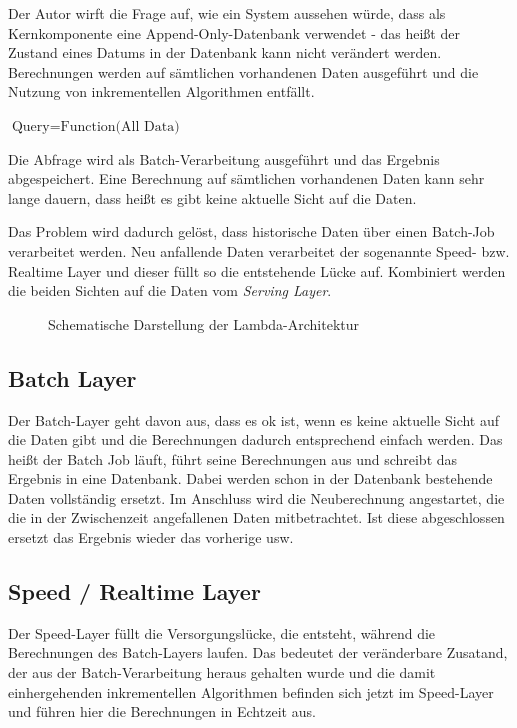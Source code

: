 \documentclass[a4paper,11pt]{scrartcl}
\begin{document}
  Der Autor wirft die Frage auf, wie ein System aussehen würde, dass als
  Kernkomponente eine Append-Only-Datenbank verwendet - das heißt der Zustand
  eines Datums in der Datenbank kann nicht verändert werden. Berechnungen werden
  auf sämtlichen vorhandenen Daten ausgeführt und die Nutzung von inkrementellen
  Algorithmen entfällt.

  $\text{Query} = \text{Function(All Data)}$

  Die Abfrage wird als Batch-Verarbeitung ausgeführt und das Ergebnis
  abgespeichert. Eine Berechnung auf sämtlichen vorhandenen Daten kann sehr lange
  dauern, dass heißt es gibt keine aktuelle Sicht auf die Daten.

  Das Problem wird dadurch gelöst, dass historische Daten über einen Batch-Job
  verarbeitet werden. Neu anfallende Daten verarbeitet der sogenannte Speed- bzw.
  Realtime Layer und dieser füllt so die entstehende Lücke auf. Kombiniert werden
  die beiden Sichten auf die Daten vom \textit{Serving Layer}.

  \begin{figure}[h]
    \center
    \scalebox{.7}{}
    \caption{Schematische Darstellung der Lambda-Architektur}
    \label{fig:lambdaarch}
  \end{figure}

  \subsection{Batch Layer}
  Der Batch-Layer geht davon aus, dass es ok ist, wenn es keine aktuelle Sicht
  auf die Daten gibt und die Berechnungen dadurch entsprechend einfach werden.
  Das heißt der Batch Job läuft, führt seine Berechnungen aus und schreibt das
  Ergebnis in eine Datenbank. Dabei werden schon in der Datenbank bestehende
  Daten vollständig ersetzt. Im Anschluss wird die Neuberechnung angestartet, die
  die in der Zwischenzeit angefallenen Daten mitbetrachtet. Ist diese
  abgeschlossen ersetzt das Ergebnis wieder das vorherige usw.

  \subsection{Speed / Realtime Layer}
  Der Speed-Layer füllt die Versorgungslücke, die entsteht, während die
  Berechnungen des Batch-Layers laufen. Das bedeutet der veränderbare Zusatand,
  der aus der Batch-Verarbeitung heraus gehalten wurde und die damit
  einhergehenden inkrementellen Algorithmen befinden sich jetzt im Speed-Layer
  und führen hier die Berechnungen in Echtzeit aus.
\end{document}
